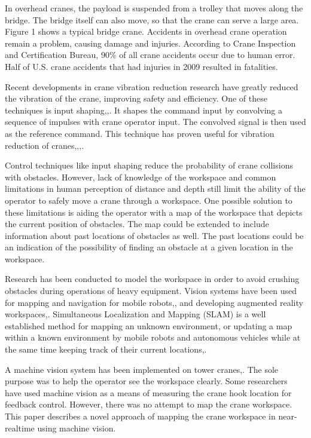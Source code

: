 \documentclass[twocolumn,10pt]{asme2e}
\begin{document}
In overhead cranes, the payload is suspended from a trolley that moves along the bridge. The bridge itself can also move, so that the crane can serve a large area. Figure 1 shows a typical bridge crane. Accidents in overhead crane operation remain a problem, causing damage and injuries\cite{beavers}. According to Crane Inspection and Certification Bureau, 90\% of all crane accidents occur due to human error\cite{cicb}. Half of U.S. crane accidents that had injuries in 2009 resulted in fatalities.

Recent developments in crane vibration reduction research have greatly reduced the vibration of the crane, improving safety and efficiency. One of these techniques is input shaping\cite{Smith},\cite{Seering},\cite{w.sing}. It shapes the command input by convolving a sequence of impulses with crane operator input. The convolved signal is then used as the reference command. This technique has proven useful for vibration reduction of cranes\cite{Singer},\cite{Sorensen},\cite{Khalid},\cite{Kim}.

Control techniques like input shaping reduce the probability of crane collisions with obstacles. However, lack of knowledge of the workspace and common limitations in human perception of distance and depth still limit the ability of the operator to safely move a crane through a workspace. One possible solution to these limitations is aiding the operator with a map of the workspace that depicts the current position of obstacles. The map could be extended to include information about past locations of obstacles as well. The past locations could be an indication of the possibility of finding an obstacle at a given location in the workspace.

Research has been conducted to model the workspace in order to avoid crushing obstacles during operations of heavy equipment\cite{changwan}.
Vision systems have been used for mapping and navigation for mobile robots\cite{murray},\cite{felix},\cite{stiller} and developing augmented reality workspaces\cite{klein},\cite{km}. Simultaneous Localization and Mapping (SLAM) is a well established method for mapping an unknown environment, or updating a map within a known environment by mobile robots and autonomous vehicles while at the same time keeping track of their current locations\cite{sebastian},\cite{dissa}.

 A machine vision system has been implemented on tower cranes\cite{Aviad},\cite{Yang}. The sole purpose was to help the operator see the workspace clearly. Some researchers have used machine vision as a means of measuring the crane hook location for feedback control\cite{Yoshida:06}. However, there was no attempt to map the crane workspace.
This paper describes a novel approach of mapping the crane workspace in near-realtime using machine vision.
\end{document}
